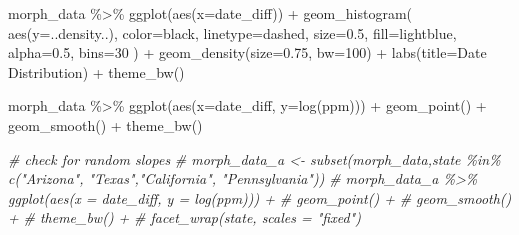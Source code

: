 \documentclass[
  11pt,
]{article}
\newenvironment{Shaded}{\begin{snugshade}}{\end{snugshade}}
\newcommand{\AttributeTok}[1]{\textcolor[rgb]{0.77,0.63,0.00}{#1}}
\newcommand{\CommentTok}[1]{\textcolor[rgb]{0.56,0.35,0.01}{\textit{#1}}}
\newcommand{\DecValTok}[1]{\textcolor[rgb]{0.00,0.00,0.81}{#1}}
\newcommand{\FloatTok}[1]{\textcolor[rgb]{0.00,0.00,0.81}{#1}}
\newcommand{\FunctionTok}[1]{\textcolor[rgb]{0.00,0.00,0.00}{#1}}
\newcommand{\NormalTok}[1]{#1}
\newcommand{\OtherTok}[1]{\textcolor[rgb]{0.56,0.35,0.01}{#1}}
\newcommand{\SpecialCharTok}[1]{\textcolor[rgb]{0.00,0.00,0.00}{#1}}
\newcommand{\StringTok}[1]{\textcolor[rgb]{0.31,0.60,0.02}{#1}}
\begin{document}
\begin{Shaded}
\end{Shaded}

\begin{Shaded}
\begin{Highlighting}[]
\NormalTok{morph\_data }\SpecialCharTok{\%\textgreater{}\%}
  \FunctionTok{ggplot}\NormalTok{(}\FunctionTok{aes}\NormalTok{(}\AttributeTok{x=}\NormalTok{date\_diff)) }\SpecialCharTok{+}
    \FunctionTok{geom\_histogram}\NormalTok{(}
      \FunctionTok{aes}\NormalTok{(}\AttributeTok{y=}\NormalTok{..density..),}
      \AttributeTok{color=}\StringTok{\textquotesingle{}black\textquotesingle{}}\NormalTok{,}
      \AttributeTok{linetype=}\StringTok{\textquotesingle{}dashed\textquotesingle{}}\NormalTok{,}
      \AttributeTok{size=}\FloatTok{0.5}\NormalTok{,}
      \AttributeTok{fill=}\StringTok{\textquotesingle{}lightblue\textquotesingle{}}\NormalTok{,}
      \AttributeTok{alpha=}\FloatTok{0.5}\NormalTok{,}
      \AttributeTok{bins=}\DecValTok{30}
\NormalTok{    ) }\SpecialCharTok{+}
    \FunctionTok{geom\_density}\NormalTok{(}\AttributeTok{size=}\FloatTok{0.75}\NormalTok{, }\AttributeTok{bw=}\DecValTok{100}\NormalTok{) }\SpecialCharTok{+}
    \FunctionTok{labs}\NormalTok{(}\AttributeTok{title=}\StringTok{\textquotesingle{}Date Distribution\textquotesingle{}}\NormalTok{) }\SpecialCharTok{+}
    \FunctionTok{theme\_bw}\NormalTok{()}
\end{Highlighting}
\end{Shaded}

\begin{Shaded}
\begin{Highlighting}[]
\NormalTok{morph\_data }\SpecialCharTok{\%\textgreater{}\%}
  \FunctionTok{ggplot}\NormalTok{(}\FunctionTok{aes}\NormalTok{(}\AttributeTok{x=}\NormalTok{date\_diff, }\AttributeTok{y=}\FunctionTok{log}\NormalTok{(ppm))) }\SpecialCharTok{+}
    \FunctionTok{geom\_point}\NormalTok{() }\SpecialCharTok{+}
    \FunctionTok{geom\_smooth}\NormalTok{() }\SpecialCharTok{+}
    \FunctionTok{theme\_bw}\NormalTok{()}

\CommentTok{\# check for random slopes}
\CommentTok{\# morph\_data\_a \textless{}{-} subset(morph\_data,state \%in\% c("Arizona", "Texas","California", "Pennsylvania"))}
\CommentTok{\# morph\_data\_a \%\textgreater{}\% ggplot(aes(x = date\_diff, y = log(ppm))) +}
\CommentTok{\#   geom\_point() +}
\CommentTok{\#   geom\_smooth() +}
\CommentTok{\#  theme\_bw() +}
\CommentTok{\#   facet\_wrap(\textquotesingle{}state\textquotesingle{}, scales = "fixed")}
\end{Highlighting}
\end{Shaded}
\end{document}
